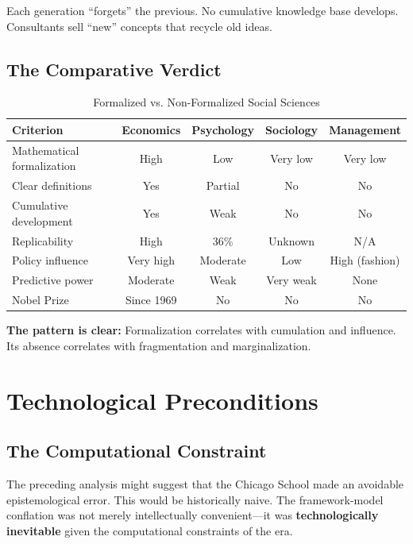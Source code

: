 \documentclass[12pt,a4paper]{article}
\begin{document}
Each generation ``forgets'' the previous. No cumulative knowledge base develops. Consultants sell ``new'' concepts that recycle old ideas.

\subsection{The Comparative Verdict}

\begin{table}[H]
\centering
\caption{Formalized vs. Non-Formalized Social Sciences}
\label{tab:comparative}
\renewcommand{\arraystretch}{1.3}
\small
\begin{tabular}{@{}lcccc@{}}
\toprule
\textbf{Criterion} & \textbf{Economics} & \textbf{Psychology} & \textbf{Sociology} & \textbf{Management} \\
\midrule
Mathematical formalization & High & Low & Very low & Very low \\
Clear definitions & Yes & Partial & No & No \\
Cumulative development & Yes & Weak & No & No \\
Replicability & High & 36\% & Unknown & N/A \\
Policy influence & Very high & Moderate & Low & High (fashion) \\
Predictive power & Moderate & Weak & Very weak & None \\
Nobel Prize & Since 1969 & No & No & No \\
\bottomrule
\end{tabular}
\end{table}

\textbf{The pattern is clear:} Formalization correlates with cumulation and influence. Its absence correlates with fragmentation and marginalization.

\section{Technological Preconditions}
\label{sec:technology}

\subsection{The Computational Constraint}

The preceding analysis might suggest that the Chicago School made an avoidable epistemological error. This would be historically naive. The framework-model conflation was not merely intellectually convenient---it was \textbf{technologically inevitable} given the computational constraints of the era.
\end{document}
